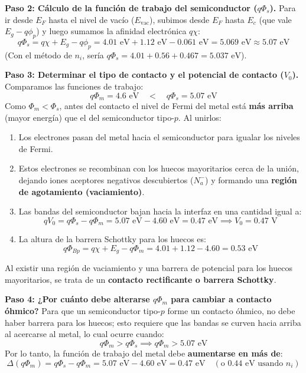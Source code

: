 \documentclass[11pt,a4paper]{article}
\begin{document}
\textbf{Paso 2: Cálculo de la función de trabajo del semiconductor ($q\Phi_s$).}
Para ir desde $E_F$ hasta el nivel de vacío ($E_{\text{vac}}$), subimos desde $E_F$ hasta $E_c$ (que vale $E_g - q\phi_p$) y luego sumamos la afinidad electrónica $q\chi$:
\[
q\Phi_s = q\chi + E_g - q\phi_p = 4.01\text{ eV} + 1.12\text{ eV} - 0.061\text{ eV} = 5.069\text{ eV} \approx 5.07\text{ eV}
\]
(Con el método de $n_i$, sería $q\Phi_s = 4.01 + 0.56 + 0.467 = 5.037\text{ eV}$).

\textbf{Paso 3: Determinar el tipo de contacto y el potencial de contacto ($V_0$).}
Comparamos las funciones de trabajo:
\[
q\Phi_m = 4.6\text{ eV} \quad < \quad q\Phi_s = 5.07\text{ eV}
\]
Como $\Phi_m < \Phi_s$, antes del contacto el nivel de Fermi del metal está \textbf{más arriba} (mayor energía) que el del semiconductor tipo-$p$. Al unirlos:
\begin{enumerate}
    \item Los electrones pasan del metal hacia el semiconductor para igualar los niveles de Fermi.
    \item Estos electrones se recombinan con los huecos mayoritarios cerca de la unión, dejando iones aceptores negativos descubiertos ($N_a^-$) y formando una \textbf{región de agotamiento (vaciamiento)}.
    \item Las bandas del semiconductor bajan hacia la interfaz en una cantidad igual a:
    \[
    qV_0 = q\Phi_s - q\Phi_m = 5.07\text{ eV} - 4.60\text{ eV} = 0.47\text{ eV} \implies V_0 = 0.47\text{ V}
    \]
    \item La altura de la barrera Schottky para los huecos es:
    \[
    q\Phi_{Bp} = q\chi + E_g - q\Phi_m = 4.01 + 1.12 - 4.60 = 0.53\text{ eV}
    \]
\end{enumerate}
Al existir una región de vaciamiento y una barrera de potencial para los huecos mayoritarios, se trata de un \textbf{contacto rectificante o barrera Schottky}.

\textbf{Paso 4: ¿Por cuánto debe alterarse $q\Phi_m$ para cambiar a contacto óhmico?}
Para que un semiconductor tipo-$p$ forme un contacto óhmico, no debe haber barrera para los huecos; esto requiere que las bandas se curven hacia arriba al acercarse al metal, lo cual ocurre cuando:
\[
q\Phi_m > q\Phi_s \implies q\Phi_m > 5.07\text{ eV}
\]
Por lo tanto, la función de trabajo del metal debe \textbf{aumentarse en más de}:
\[
\Delta(q\Phi_m) = q\Phi_s - q\Phi_m = 5.07\text{ eV} - 4.60\text{ eV} = 0.47\text{ eV} \quad (\text{o } 0.44\text{ eV usando } n_i)
\]
\end{document}
